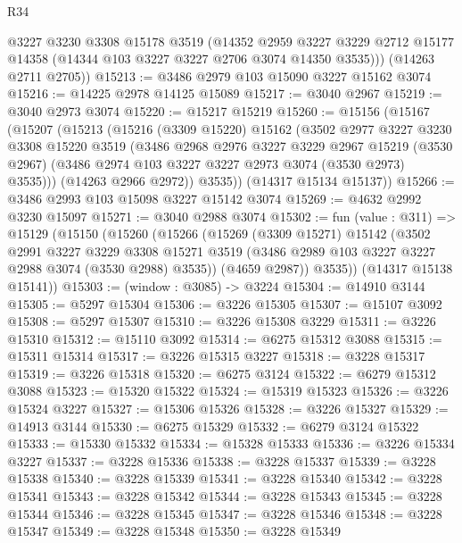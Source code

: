\begin{lexlean}{R34}
\begin{coremodule}
        @3227
        @3230
        @3308
        @15178
        @3519
        (@14352
          @2959
          @3227
          @3229
          @2712
          @15177
          @14358
          (@14344 @103 @3227 @3227 @2706 @3074 @14350 @3535)))
      (@14263 @2711 @2705))
@15213 := @3486 @2979 @103 @15090 @3227 @15162 @3074
@15216 := @14225 @2978 @14125 @15089
@15217 := @3040 @2967
@15219 := @3040 @2973 @3074
@15220 := @15217 @15219
@15260 := @15156
    (@15167
      (@15207
        (@15213
          (@15216
            (@3309 @15220)
            @15162
            (@3502
              @2977
              @3227
              @3230
              @3308
              @15220
              @3519
              (@3486
                @2968
                @2976
                @3227
                @3229
                @2967
                @15219
                (@3530 @2967)
                (@3486 @2974 @103 @3227 @3227 @2973 @3074 (@3530 @2973) @3535)))
            (@14263 @2966 @2972))
          @3535))
      (@14317 @15134 @15137))
@15266 := @3486 @2993 @103 @15098 @3227 @15142 @3074
@15269 := @4632 @2992 @3230 @15097
@15271 := @3040 @2988 @3074
@15302 := fun (value : @311) =>
  @15129
    (@15150
      (@15260
        (@15266
          (@15269
            (@3309 @15271)
            @15142
            (@3502
              @2991
              @3227
              @3229
              @3308
              @15271
              @3519
              (@3486 @2989 @103 @3227 @3227 @2988 @3074 (@3530 @2988) @3535))
            (@4659 @2987))
          @3535))
      (@14317 @15138 @15141))
@15303 := (window : @3085) -> @3224
@15304 := @14910 @3144
@15305 := @5297 @15304
@15306 := @3226 @15305
@15307 := @15107 @3092
@15308 := @5297 @15307
@15310 := @3226 @15308 @3229
@15311 := @3226 @15310
@15312 := @15110 @3092
@15314 := @6275 @15312 @3088
@15315 := @15311 @15314
@15317 := @3226 @15315 @3227
@15318 := @3228 @15317
@15319 := @3226 @15318
@15320 := @6275 @3124
@15322 := @6279 @15312 @3088
@15323 := @15320 @15322
@15324 := @15319 @15323
@15326 := @3226 @15324 @3227
@15327 := @15306 @15326
@15328 := @3226 @15327
@15329 := @14913 @3144
@15330 := @6275 @15329
@15332 := @6279 @3124 @15322
@15333 := @15330 @15332
@15334 := @15328 @15333
@15336 := @3226 @15334 @3227
@15337 := @3228 @15336
@15338 := @3228 @15337
@15339 := @3228 @15338
@15340 := @3228 @15339
@15341 := @3228 @15340
@15342 := @3228 @15341
@15343 := @3228 @15342
@15344 := @3228 @15343
@15345 := @3228 @15344
@15346 := @3228 @15345
@15347 := @3228 @15346
@15348 := @3228 @15347
@15349 := @3228 @15348
@15350 := @3228 @15349

\end{coremodule}
\end{lexlean}
